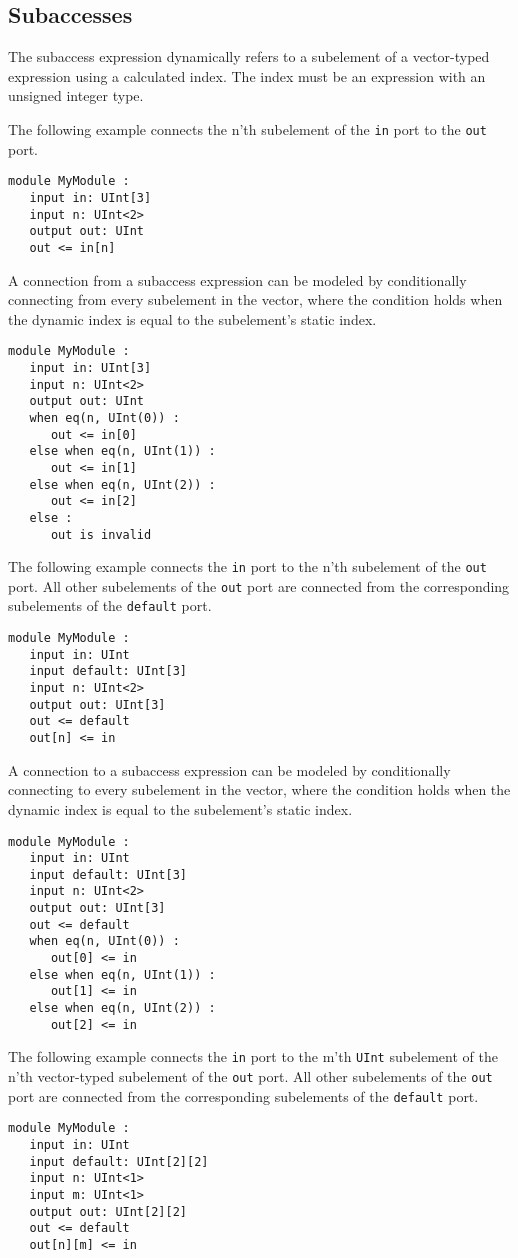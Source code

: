 \documentclass[12pt]{article}
\begin{document}
\subsection{Subaccesses}
The subaccess expression dynamically refers to a subelement of a vector-typed expression using a calculated index. The index must be an expression with an unsigned integer type.

The following example connects the n'th subelement of the \verb|in| port to the \verb|out| port.
\begin{lstlisting}
module MyModule :
   input in: UInt[3]
   input n: UInt<2>
   output out: UInt
   out <= in[n]
\end{lstlisting}

A connection from a subaccess expression can be modeled by conditionally connecting from every subelement in the vector, where the condition holds when the dynamic index is equal to the subelement's static index.
\begin{lstlisting}
module MyModule :
   input in: UInt[3]
   input n: UInt<2>
   output out: UInt
   when eq(n, UInt(0)) :
      out <= in[0]
   else when eq(n, UInt(1)) :
      out <= in[1]
   else when eq(n, UInt(2)) :
      out <= in[2]            
   else :
      out is invalid
\end{lstlisting}

The following example connects the \verb|in| port to the n'th subelement of the \verb|out| port. All other subelements of the \verb|out| port are connected from the corresponding subelements of the \verb|default| port.
\begin{lstlisting}
module MyModule :
   input in: UInt
   input default: UInt[3]
   input n: UInt<2>
   output out: UInt[3]
   out <= default
   out[n] <= in
\end{lstlisting}

A connection to a subaccess expression can be modeled by conditionally connecting to every subelement in the vector, where the condition holds when the dynamic index is equal to the subelement's static index.
\begin{lstlisting}
module MyModule :
   input in: UInt
   input default: UInt[3]
   input n: UInt<2>
   output out: UInt[3]   
   out <= default
   when eq(n, UInt(0)) :
      out[0] <= in
   else when eq(n, UInt(1)) :
      out[1] <= in
   else when eq(n, UInt(2)) :
      out[2] <= in
\end{lstlisting}

The following example connects the \verb|in| port to the m'th \verb|UInt| subelement of the n'th vector-typed subelement of the \verb|out| port. All other subelements of the \verb|out| port are connected from the corresponding subelements of the \verb|default| port.
\begin{lstlisting}
module MyModule :
   input in: UInt
   input default: UInt[2][2]
   input n: UInt<1>
   input m: UInt<1>
   output out: UInt[2][2]
   out <= default
   out[n][m] <= in
\end{lstlisting}
\end{document}
